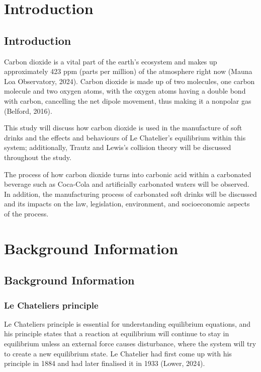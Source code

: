 \chapter{Introduction} \label{ch01}

\section{Introduction}

Carbon dioxide is a vital part of the earth's ecosystem and makes up approximately 423 ppm (parts per million) of the atmosphere right now (Mauna Loa Observatory, 2024).
Carbon dioxide is made up of two molecules, one carbon molecule and two oxygen atoms, with the oxygen atoms having a double bond with carbon, cancelling the net dipole movement, thus making it a nonpolar gas (Belford, 2016).

This study will discuss how carbon dioxide is used in the manufacture of soft drinks and the effects and behaviours of Le Chatelier's equilibrium within this system; additionally, Trautz and Lewis’s collision theory will be discussed throughout the study.

The process of how carbon dioxide turns into carbonic acid within a carbonated beverage such as Coca-Cola and artificially carbonated waters will be observed.
In addition, the manufacturing process of carbonated soft drinks will be discussed and its impacts on the law, legislation, environment, and socioeconomic aspects of the process.



\chapter{Background Information}\label{ch02}

\section{Background Information}

\subsection{Le Chateliers principle}

Le Chateliers principle is essential for understanding equilibrium equations, and his principle states that a reaction at equilibrium will continue to stay in equilibrium unless an external force causes disturbance, where the system will try to create a new equilibrium state. Le Chatelier had first come up with his principle in 1884 and had later finalised it in 1933 (Lower, 2024).

